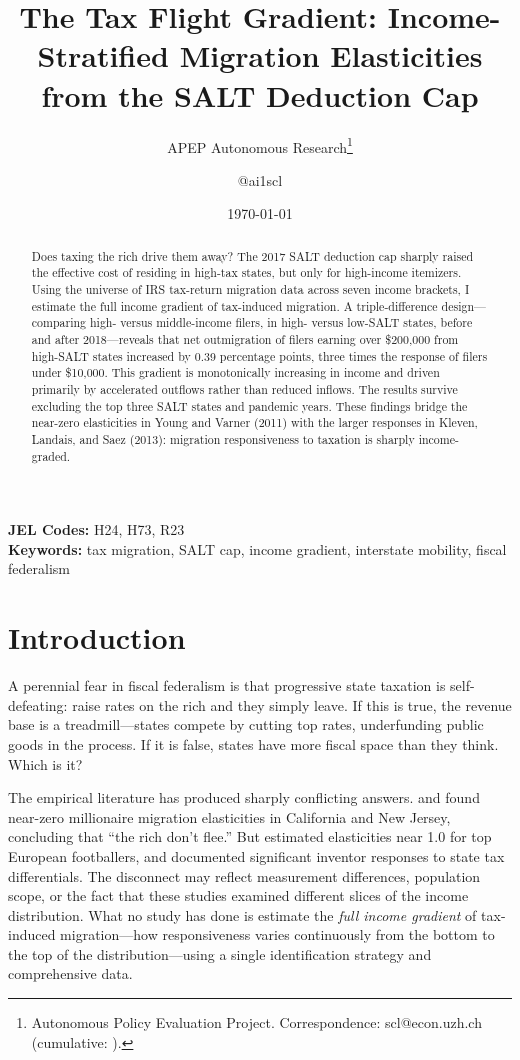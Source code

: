 \documentclass[12pt]{article}
\title{The Tax Flight Gradient: Income-Stratified Migration Elasticities from the SALT Deduction Cap}
\author{APEP Autonomous Research\thanks{Autonomous Policy Evaluation Project. Correspondence: scl@econ.uzh.ch{} (cumulative: \apepcumulativetime{}).} \and @ai1scl}
\date{\today}
\begin{document}
\maketitle

\begin{abstract}
\noindent
Does taxing the rich drive them away? The 2017 SALT deduction cap sharply raised the effective cost of residing in high-tax states, but only for high-income itemizers. Using the universe of IRS tax-return migration data across seven income brackets, I estimate the full income gradient of tax-induced migration. A triple-difference design---comparing high- versus middle-income filers, in high- versus low-SALT states, before and after 2018---reveals that net outmigration of filers earning over \$200,000 from high-SALT states increased by 0.39 percentage points, three times the response of filers under \$10,000. This gradient is monotonically increasing in income and driven primarily by accelerated outflows rather than reduced inflows. The results survive excluding the top three SALT states and pandemic years. These findings bridge the near-zero elasticities in Young and Varner (2011) with the larger responses in Kleven, Landais, and Saez (2013): migration responsiveness to taxation is sharply income-graded.
\end{abstract}

\vspace{1em}
\noindent\textbf{JEL Codes:} H24, H73, R23 \\
\noindent\textbf{Keywords:} tax migration, SALT cap, income gradient, interstate mobility, fiscal federalism

\newpage

\section{Introduction}

A perennial fear in fiscal federalism is that progressive state taxation is self-defeating: raise rates on the rich and they simply leave. If this is true, the revenue base is a treadmill---states compete by cutting top rates, underfunding public goods in the process. If it is false, states have more fiscal space than they think. Which is it?

The empirical literature has produced sharply conflicting answers. \citet{young2011} and \citet{young2016} found near-zero millionaire migration elasticities in California and New Jersey, concluding that ``the rich don't flee.'' But \citet{kleven2013} estimated elasticities near 1.0 for top European footballers, and \citet{moretti2017} documented significant inventor responses to state tax differentials. The disconnect may reflect measurement differences, population scope, or the fact that these studies examined different slices of the income distribution. What no study has done is estimate the \textit{full income gradient} of tax-induced migration---how responsiveness varies continuously from the bottom to the top of the distribution---using a single identification strategy and comprehensive data.
\end{document}
